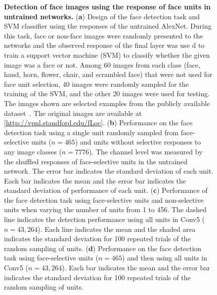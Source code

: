 \documentclass[final,3p,times,twocolumn]{elsarticle}
\begin{document}
\begin{figure}[htbp]
	
	\centering
	\caption{
		\textbf{Detection of face images using the response of face units in untrained networks.
		}
	(\textbf{a}) Design of the face detection task and SVM classifier using the responses of the untrained AlexNet.
	During this task, face or non-face images were randomly presented to the networks and the observed response of the final layer was use d to train a support vector machine (SVM) to classify whether the given image was a face or not.
	Among 60 images from each class (face, hand, horn, flower, chair, and scrambled face) that were not used for face unit selection, 40 images were randomly sampled for the training of the SVM, and the other 20 images were used for testing.
	The images shown are selected examples from the publicly available dataset~\cite{stigliani2015temporal}.
	The original images are available at [\url{http://vpnl.standford.edu/fLoc}].
	(\textbf{b}) Performance on the face detection task using a single unit randomly sampled from face-selective units ($ n = 465 $) and units without selective responses to any image classes ($ n = 7776 $).
	The channel level was measured by the shuffled responses of face-selective units in the untrained network.
	The error bar indicates the standard deviation of each unit.
	Each bar indicates the mean and the error bar indicates the standard deviation of performance of each unit.
	(\textbf{c}) Performance of the face detection task using face-selective units and non-selective units when varying the number of units from 1 to 456.
	The dashed line indicates the detection performance using all units in Conv5 ($ n=43,264 $).
	Each line indicates the mean and the shaded area indicates the standard deviation for 100 repeated trials of the random sampling of units.
	(\textbf{d}) Performance on the face detection task using face-selective units ($ n=465 $) and then using all units in Conv5 ($ n=43,264 $).
	Each bar indicates the mean and the error bar indicates the standard deviation for 100 repeated trials of the random sampling of units.
	}
	\label{fig:detection}
\end{figure}
\end{document}
